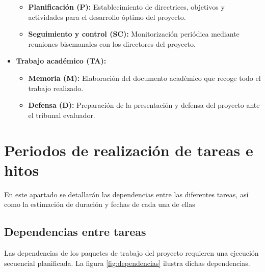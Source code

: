 \begin{itemize}
    \begin{itemize}
      \item\textbf{Planificación (P):} Establecimiento de directrices, objetivos y actividades para el desarrollo óptimo del proyecto.
      \item\textbf{Seguimiento y control (SC):} Monitorización periódica mediante reuniones bisemanales con los directores del proyecto.
    \end{itemize}
  \item\textbf{Trabajo académico (TA):}
    \begin{itemize}
      \item\textbf{Memoria (M):} Elaboración del documento académico que recoge todo el trabajo realizado.
      \item\textbf{Defensa (D):} Preparación de la presentación y defensa del proyecto ante el tribunal evaluador.
    \end{itemize}
\end{itemize}

\section{Periodos de realización de tareas e hitos}
En este apartado se detallarán las dependencias entre las diferentes tareas, así como la estimación de duración y fechas de cada una de ellas

\subsection{Dependencias entre tareas}
Las dependencias de los paquetes de trabajo del proyecto requieren una ejecución secuencial planificada. La figura \ref{fig:dependencias} ilustra dichas dependencias.

